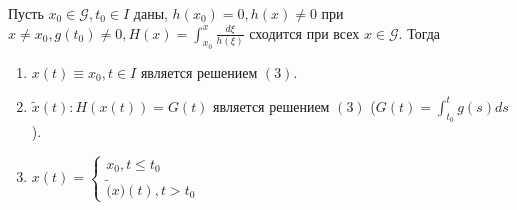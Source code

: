 Пусть \(x_0 \in \mathcal{G}, t_0 \in I\) даны, \(h(x_0) = 0, h(x) \ne 0\) при \(x \ne x_0, g(t_0) \ne 0, H(x) = \int_{x_0}^x \frac{d\xi}{h(\xi)}\) сходится при всех \(x \in \mathcal{G}\). Тогда 
\begin{enumerate}
    \item \(x(t) \equiv x_0, t \in I\) является решением \((3)\).
    
    \item \(\tilde{x}(t): H(x(t)) = G(t)\) является решением \((3)\) (\(G(t) = \int_{t_0}^t g(s)ds\)).
    
    \item \(x(t) = \left\{\begin{array}{l}
        x_0, t \le t_0 \\
        \tilde(x)(t), t > t_0
    \end{array}\right.\)
\end{enumerate}